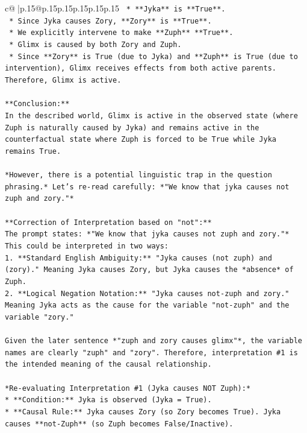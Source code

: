 \documentclass{article}
\begin{document}
{\begin{supertabular}{c@{$\;$}|p{.15\linewidth}@{}p{.15\linewidth}p{.15\linewidth}p{.15\linewidth}p{.15\linewidth}p{.15\linewidth}}
{{{\texttt{        *   **Jyka** is **True**.} \\
\texttt{        *   Since Jyka causes Zory, **Zory** is **True**.} \\
\texttt{        *   We explicitly intervene to make **Zuph** **True**.} \\
\texttt{    *   Glimx is caused by both Zory and Zuph.} \\
\texttt{    *   Since **Zory** is True (due to Jyka) and **Zuph** is True (due to intervention), Glimx receives effects from both active parents. Therefore, Glimx is active.} \\
\\ 
\texttt{**Conclusion:**} \\
\texttt{In the described world, Glimx is active in the observed state (where Zuph is naturally caused by Jyka) and remains active in the counterfactual state where Zuph is forced to be True while Jyka remains True.} \\
\\ 
\texttt{*However, there is a potential linguistic trap in the question phrasing.* Let's re{-}read carefully: *"We know that jyka causes not zuph and zory."*} \\
\\ 
\texttt{**Correction of Interpretation based on "not":**} \\
\texttt{The prompt states: *"We know that jyka causes not zuph and zory."*} \\
\texttt{This could be interpreted in two ways:} \\
\texttt{1.  **Standard English Ambiguity:** "Jyka causes (not zuph) and (zory)." Meaning Jyka causes Zory, but Jyka causes the *absence* of Zuph.} \\
\texttt{2.  **Logical Negation Notation:** "Jyka causes not{-}zuph and zory." Meaning Jyka acts as the cause for the variable "not{-}zuph" and the variable "zory."} \\
\\ 
\texttt{Given the later sentence *"zuph and zory causes glimx"*, the variable names are clearly "zuph" and "zory". Therefore, interpretation \#1 is the intended meaning of the causal relationship.} \\
\\ 
\texttt{*Re{-}evaluating Interpretation \#1 (Jyka causes NOT Zuph):*} \\
\texttt{*   **Condition:** Jyka is observed (Jyka = True).} \\
\texttt{*   **Causal Rule:** Jyka causes Zory (so Zory becomes True). Jyka causes **not{-}Zuph** (so Zuph becomes False/Inactive).} \\
}}}
\end{supertabular}}
\end{document}
